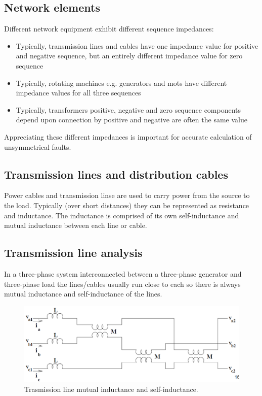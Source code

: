 \subsection{Network elements}
Different network equipment exhibit different sequence impedances:
\begin{itemize}
	\item Typically, transmission lines and cables have one impedance value for positive and negative sequence, but an entirely different impedance value for zero sequence
	\item Typically, rotating machines e.g. generators and mots have different impedance values for all three sequences
	\item Typically, transformers positive, negative and zero sequence components depend upon connection by positive and negative are often the same value
\end{itemize}
Appreciating these different impedances is important for accurate calculation of unsymmetrical faults.
\subsection{Transmission lines and distribution cables}
Power cables and transmission linse are used to carry power from the source to the load. Typically (over short distances) they can be represented as resistance and inductance. The inductance is comprised of its own self-inductance and mutual inductance between each line or cable.
\subsection{Transmission line analysis}
In a three-phase system interconnected between a three-phase generator and three-phase load the lines/cables usually run close to each so there is always mutual inductance and self-inductance of the lines.
\begin{figure}[H]
	\centering
	\includegraphics[width = \textwidth]{./img/figure32.png}
	\caption{Trasmission line mutual inductance and self-inductance.}
\end{figure}
